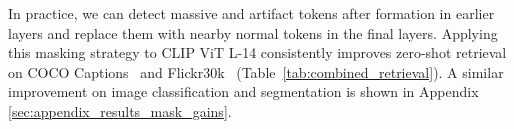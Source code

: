 In practice, we can detect massive and artifact tokens after formation in earlier layers and replace them with nearby normal tokens in the final layers. Applying this masking strategy to CLIP ViT L-14 consistently improves zero-shot retrieval on COCO Captions~\cite{chen2015coco} and Flickr30k~\cite{young2014flickr} (Table~\ref{tab:combined_retrieval}). A similar improvement on image classification and segmentation is shown in Appendix \ref{sec:appendix_results_mask_gains}.











